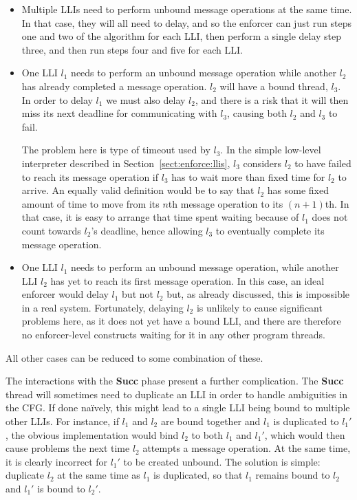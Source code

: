 \begin{itemize}
\item Multiple LLIs need to perform unbound message operations at the
  same time.  In that case, they will all need to delay, and so the
  enforcer can just run steps one and two of the algorithm for each
  LLI, then perform a single delay step three, and then run steps four
  and five for each LLI.
\item One LLI $l_1$ needs to perform an unbound message operation
  while another $l_2$ has already completed a message operation.
  $l_2$ will have a bound thread, $l_3$.  In order to delay $l_1$ we
  must also delay $l_2$, and there is a risk that it will then miss
  its next deadline for communicating with $l_3$, causing both $l_2$
  and $l_3$ to fail.

  The problem here is type of timeout used by $l_3$.  In the simple
  low-level interpreter described in Section~\ref{sect:enforce:llis},
  $l_3$ considers $l_2$ to have failed to reach its message operation
  if $l_3$ has to wait more than fixed time for $l_2$ to arrive.  An
  equally valid definition would be to say that $l_2$ has some fixed
  amount of time to move from its $n$th message operation to its
  $(n+1)$th.  In that case, it is easy to arrange that time spent waiting because of $l_1$
  does not count towards $l_2$'s deadline, hence allowing $l_3$ to
  eventually complete its message operation.
\item One LLI $l_1$ needs to perform an unbound message operation,
  while another LLI $l_2$ has yet to reach its first message
  operation.  In this case, an ideal enforcer would delay $l_1$ but
  not $l_2$ but, as already discussed, this is impossible in a real
  system.  Fortunately, delaying $l_2$ is unlikely to cause
  significant problems here, as it does not yet have a bound LLI, and
  there are therefore no enforcer-level constructs waiting for it in
  any other program threads.
\end{itemize}
    
All other cases can be reduced
to some combination of these.

The interactions with the \textbf{Succ} phase present a further
complication.  The \textbf{Succ} thread will sometimes need to
duplicate an LLI in order to handle ambiguities in the CFG.  If done
na\"ively, this might lead to a single LLI being bound to multiple
other LLIs.  For instance, if $l_1$ and $l_2$ are bound together and
$l_1$ is duplicated to $l_1'$, the obvious implementation would bind
$l_2$ to both $l_1$ and $l_1'$, which would then cause problems the
next time $l_2$ attempts a message operation.  At the same time,
it is clearly incorrect for $l_1'$ to be created unbound.
The solution is simple: duplicate $l_2$ at the same time as $l_1$
is duplicated, so that $l_1$ remains bound to $l_2$ and $l_1'$ is
bound to $l_2'$.

